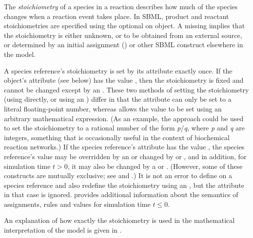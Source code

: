 The {\em stoichiometry} of a species in a reaction describes how
much of the species changes when a reaction event takes place.  In
SBML, product and reactant stoichiometries are specified using the
optional  on \SpeciesReference object.    A missing
 implies that the stoichiometry is either
unknown, or to be obtained from an external source, or determined
by an initial assignment () or
other SBML construct elsewhere in the model.

A species reference's stoichiometry is set by its
 attribute exactly once.  If the
\SpeciesReference object's  attribute (see below)
has the value , then the stoichiometry is fixed and
cannot be changed except by an \InitialAssignment.  These two
methods of setting the stoichiometry (\ie using
 directly, or using an \InitialAssignment)
differ in that the  attribute can only be set
to a literal floating-point number, whereas \InitialAssignment
allows the value to be set using an arbitrary mathematical
expression.  (As an example, the approach could be used to set the
stoichiometry to a rational number of the form \emph{p}/\emph{q},
where \emph{p} and \emph{q} are integers, something that is
occasionally useful in the context of biochemical reaction
networks.)  If the species reference's  attribute
has the value , the species reference's value may be
overridden by an \InitialAssignment or changed by \AssignmentRule
or \AlgebraicRule, and in addition, for simulation time $t > 0$,
it may also be changed by a \RateRule or \Event.  (However,
some of these constructs are mutually exclusive; see
 and .)  It is not an
error to define  on a species reference and
also redefine the stoichiometry using an \InitialAssignment, but
the  attribute in that case is ignored.
 provides additional information about
the semantics of assignments, rules and values for simulation time
$t \leq 0$.  

An explanation of how exactly the stoichiometry is used in the
mathematical interpretation of the model is given in
.


